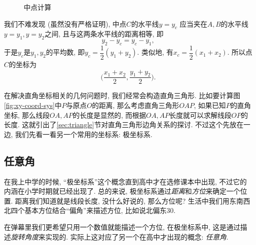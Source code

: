\begin{figure}[htbp]
  \centering
  \caption{中点计算}
  \label{fig:centerpoint}
\end{figure}

我们不难发现 (虽然没有严格证明),
中点$C$的水平线$y = y_c$
应当夹在$A,B$的水平线$y = y_1, y = y_2$之间,
且与这两条水平线的距离相等, 即
\[y_2 - y_c = y_c - y_1,\]
于是$y_c$是$y_1,y_2$的平均数,
即$y_c = \dfrac12 (y_1 + y_2)$.
类似地, 有$x_c = \dfrac12 (x_1 + x_2)$.
所以点$C$的坐标为
\[
  \Big(\dfrac{x_1+x_2}{2},\dfrac{y_1+y_2}{2}\Big).
\]

在解决直角坐标相关的几何问题时, 我们经常会构造直角三角形.
比如要计算图\ref{fig:xy-coord-sys}中$P$与原点$O$的距离,
那么考虑直角三角形$OAP$, 如果已知$P$的直角坐标,
那么线段$OA,AP$的长度是显然的,
而根据$OA,AP$长度就可以求解线段$OP$的长度.
这就引出了\ref{sec:triangle}节对直角三角形边角关系的探讨.
不过这个先放在一边, 我们先看一看另一个常用的坐标系:
极坐标系.

\subsection{任意角}

在我上中学的时候, ``极坐标系''这个概念直到高中才在选修课本中出现,
不过它的内涵在小学时期就已经出现了.
总的来说, 极坐标系通过\emph{距离}和\emph{方位}来确定一个位置.
距离我们知道就是线段长度, 没什么好说的, 那么方位呢?
生活中我们用东南西北四个基本方位结合``偏角''来描述方位,
比如说北偏东30\degree.

在弹幕里我们更希望只用一个数值就能描述一个方位,
在极坐标系中, 这是通过描述\emph{旋转角度}来实现的.
实际上这对应了另一个在高中才出现的概念: \emph{任意角}.

